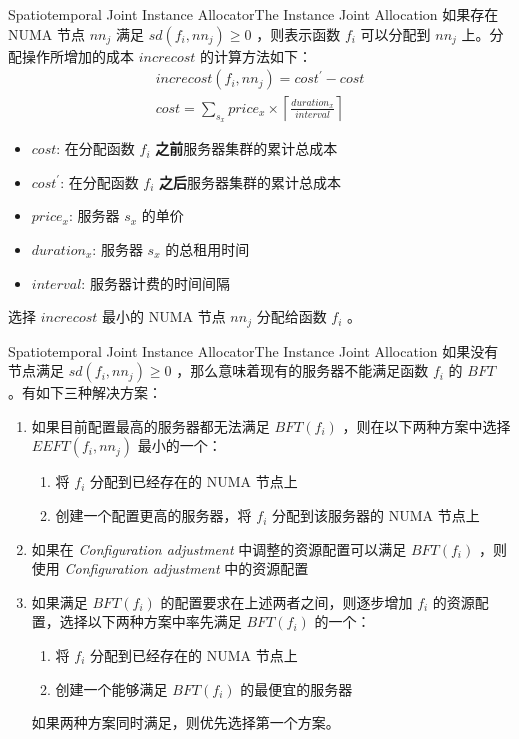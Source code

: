 \documentclass[aspectratio=169]{beamer}
\begin{document}
\begin{frame}{Spatiotemporal Joint Instance Allocator}{The Instance Joint Allocation}
  如果存在 NUMA 节点 $nn_j$ 满足 $sd(f_i, nn_j) \geqslant 0$ ，则表示函数 $f_i$ 可以分配到 $nn_j$ 上。分配操作所增加的成本 $increcost$ 的计算方法如下：
  \begin{gather*}
    increcost(f_i, nn_j) = cost^\prime - cost \\
    cost = \sum_{s_x} price_x \times \left\lceil \frac{duration_x}{interval} \right\rceil
  \end{gather*}
  \begin{itemize}
    \item $cost$: 在分配函数 $f_i$ \textbf{之前}服务器集群的累计总成本
    \item $cost^\prime$: 在分配函数 $f_i$ \textbf{之后}服务器集群的累计总成本
    \item $price_x$: 服务器 $s_x$ 的单价
    \item $duration_x$: 服务器 $s_x$ 的总租用时间
    \item $interval$: 服务器计费的时间间隔
  \end{itemize}
  选择 $increcost$ 最小的 NUMA 节点 $nn_j$ 分配给函数 $f_i$ 。
\end{frame}

\begin{frame}{Spatiotemporal Joint Instance Allocator}{The Instance Joint Allocation}
  如果没有节点满足 $sd(f_i, nn_j) \geqslant 0$ ，那么意味着现有的服务器不能满足函数 $f_i$ 的 $BFT$ 。有如下三种解决方案：
  \begin{enumerate}
    \item 如果目前配置最高的服务器都无法满足 $BFT(f_i)$ ，则在以下两种方案中选择 $EEFT(f_i, nn_j)$ 最小的一个：
      \begin{enumerate}
        \item 将 $f_i$ 分配到已经存在的 NUMA 节点上
        \item 创建一个配置更高的服务器，将 $f_i$ 分配到该服务器的 NUMA 节点上
      \end{enumerate}
    \item 如果在 \textit{Configuration adjustment} 中调整的资源配置可以满足 $BFT(f_i)$ ，则使用 \textit{Configuration adjustment} 中的资源配置
    \item 如果满足 $BFT(f_i)$ 的配置要求在上述两者之间，则逐步增加 $f_i$ 的资源配置，选择以下两种方案中率先满足 $BFT(f_i)$ 的一个：
      \begin{enumerate}
        \item 将 $f_i$ 分配到已经存在的 NUMA 节点上
        \item 创建一个能够满足 $BFT(f_i)$ 的最便宜的服务器
      \end{enumerate}
      如果两种方案同时满足，则优先选择第一个方案。
  \end{enumerate}
\end{frame}
\end{document}
